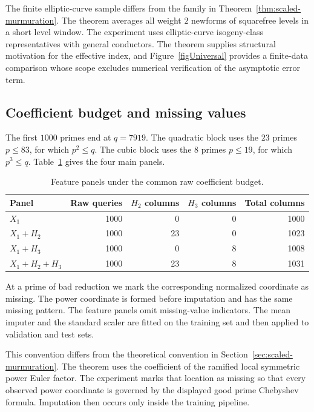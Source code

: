 \documentclass[12pt,reqno]{amsart}
\numberwithin{equation}{section}
\theoremstyle{plain}
\theoremstyle{definition}
\theoremstyle{remark}
\begin{document}
The finite elliptic-curve sample differs from the family in Theorem~\ref{thm:scaled-murmuration}.
The theorem averages all weight $2$ newforms of squarefree levels in a short level window.
The experiment uses elliptic-curve isogeny-class representatives with general conductors.
The theorem supplies structural motivation for the effective index, and Figure~\ref{figUniversal} provides a finite-data comparison whose scope excludes numerical verification of the asymptotic error term.

\subsection{Coefficient budget and missing values}

The first $1000$ primes end at $q=7919$.  The quadratic block uses the $23$ primes $p\leq83$, for which $p^2\leq q$.
The cubic block uses the $8$ primes $p\leq19$, for which $p^3\leq q$.
Table~\ref{tabBudget} gives the four main panels.

\begin{table}[t]
\centering
\caption{Feature panels under the common raw coefficient budget.}
\label{tabBudget}
\begin{tabular}{lrrrr}
\toprule
Panel & Raw queries & $H_2$ columns & $H_3$ columns & Total columns\\
\midrule
$X_1$ & 1000 & 0 & 0 & 1000\\
$X_1+H_2$ & 1000 & 23 & 0 & 1023\\
$X_1+H_3$ & 1000 & 0 & 8 & 1008\\
$X_1+H_2+H_3$ & 1000 & 23 & 8 & 1031\\
\bottomrule
\end{tabular}
\end{table}

At a prime of bad reduction we mark the corresponding normalized coordinate as missing.
The power coordinate is formed before imputation and has the same missing pattern.
The feature panels omit missing-value indicators.
The mean imputer and the standard scaler are fitted on the training set and then applied to validation and test sets.

This convention differs from the theoretical convention in Section~\ref{sec:scaled-murmuration}.
The theorem uses the coefficient of the ramified local symmetric power Euler factor.
The experiment marks that location as missing so that every observed power coordinate is governed by the displayed good prime Chebyshev formula.
Imputation then occurs only inside the training pipeline.
\end{document}
